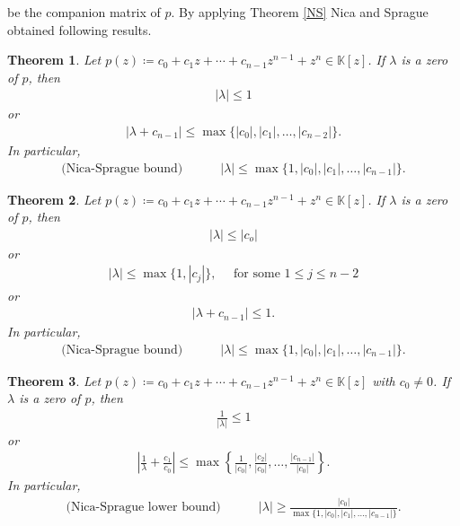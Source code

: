 \documentclass{amsart}
\newtheorem{theorem}{Theorem}[section]
\begin{document}
be the companion matrix of $p$. By applying Theorem \ref{NS} Nica and Sprague obtained following results.
\begin{theorem} \cite{NICASPRAGUE}
	Let $p(z)\coloneqq c_0+c_1z+\cdots +c_{n-1}z^{n-1}+z^n \in \mathbb{K}[z]$.  If $\lambda$ is a  zero of $p$, then 
	\begin{align*}
		|\lambda|\leq 1
	\end{align*}
	or 
	\begin{align*}
		|\lambda+c_{n-1}|\leq \max\{|c_0|, |c_1|, \dots,  |c_{n-2}|\}.
	\end{align*}
	In particular, 
	\begin{align*}
	\text{(Nica-Sprague bound)} \quad \quad \quad	|\lambda|\leq \max\{1, |c_0|, |c_1|, \dots, |c_{n-1}|\}.
	\end{align*}
\end{theorem}
\begin{theorem} \cite{NICASPRAGUE}
	Let $p(z)\coloneqq c_0+c_1z+\cdots +c_{n-1}z^{n-1}+z^n \in \mathbb{K}[z]$.  If $\lambda$ is a  zero of $p$, then 
	\begin{align*}
		|\lambda|\leq |c_o|
	\end{align*}
	or 
	\begin{align*}
		|\lambda|\leq \max\{1, |c_j|\}, \quad \text{ for some } 1\leq j \leq n-2
	\end{align*}
or
	\begin{align*}
		|\lambda +c_{n-1}|\leq 1.
	\end{align*}
In particular, 
\begin{align}\label{NSB}
	\text{(Nica-Sprague bound)} \quad \quad \quad	|\lambda|\leq \max\{1, |c_0|, |c_1|, \dots, |c_{n-1}|\}.
\end{align}
\end{theorem}
\begin{theorem} \cite{NICASPRAGUE}
	Let $p(z)\coloneqq c_0+c_1z+\cdots +c_{n-1}z^{n-1}+z^n \in \mathbb{K}[z]$ with $c_0\neq 0$.  If $\lambda$ is a  zero of $p$, then 
	\begin{align*}
	\frac{1}{|\lambda|}\leq  1
	\end{align*}
	or 
	\begin{align*}
	\left|\frac{1}{\lambda}+\frac{c_1}{c_0}\right|	\leq \max\left\{\frac{1}{|c_0|}, \frac{|c_2|}{|c_0|}, \dots,  \frac{|c_{n-1}|}{|c_0|}\right\}.
	\end{align*}
	In particular, 
	\begin{align*}
		\text{(Nica-Sprague lower bound)} \quad \quad \quad	|\lambda|\geq  \frac{|c_0|}{\max\{1, |c_0|, |c_1|, \dots, |c_{n-1}|\}}.
	\end{align*}
\end{theorem}
\end{document}
